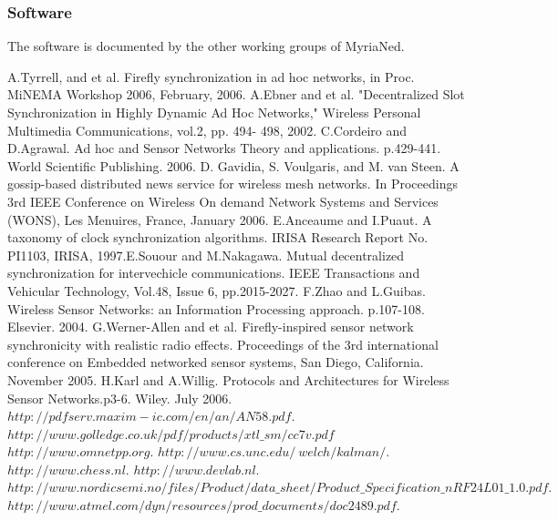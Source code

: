 \documentclass[a4paper,10pt]{report}
\begin{document}
\subsubsection{Software}
The software is documented by the other working groups of MyriaNed.
\begin{thebibliography}{\textbf{References}}
A.Tyrrell, and et al. Firefly synchronization in ad hoc networks, in Proc. MiNEMA Workshop 2006, February, 2006.
A.Ebner and et al. "Decentralized Slot Synchronization in Highly Dynamic Ad Hoc Networks," Wireless Personal Multimedia Communications, vol.2, pp. 494- 498, 2002.
C.Cordeiro and D.Agrawal. Ad hoc and Sensor Networks Theory and applications. p.429-441. World Scientific Publishing. 2006.
D. Gavidia, S. Voulgaris, and M. van Steen. A gossip-based distributed news service for wireless mesh networks. In Proceedings 3rd IEEE Conference on Wireless On demand Network Systems and Services (WONS), Les Menuires, France, January 2006.
E.Anceaume and I.Puaut. A taxonomy of clock synchronization algorithms. IRISA Research Report No. PI1103, IRISA, 1997.E.Souour and M.Nakagawa. Mutual decentralized synchronization for intervechicle communications. IEEE Transactions and Vehicular Technology, Vol.48, Issue 6, pp.2015-2027.
F.Zhao and  L.Guibas. Wireless Sensor Networks: an Information Processing approach. p.107-108. Elsevier. 2004.
G.Werner-Allen and et al. Firefly-inspired sensor network synchronicity with realistic radio effects. Proceedings of the 3rd international conference on Embedded networked sensor systems, San Diego, California. November 2005.
H.Karl and A.Willig. Protocols and Architectures for Wireless Sensor Networks.p3-6. Wiley. July 2006.
$http://pdfserv.maxim-ic.com/en/an/AN58.pdf$.
 $http://www.golledge.co.uk/pdf/products/xtl\_sm/cc7v.pdf$
$http://www.omnetpp.org$.
$http://www.cs.unc.edu/~welch/kalman/$.
$http://www.chess.nl$.
$http://www.devlab.nl.$
$http://www.nordicsemi.no/files/Product/data\_sheet/Product\_Specification\_nRF24L01\_1.0.pdf.$
$http://www.atmel.com/dyn/resources/prod\_documents/doc2489.pdf.$

\end{thebibliography}
\end{document}
